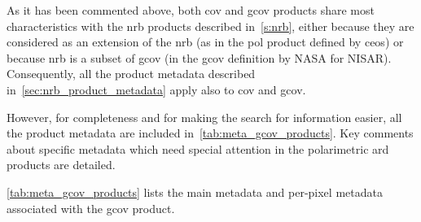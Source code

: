 As it has been commented above, both \acs{cov} and \acs{gcov} products share most characteristics with the \acs{nrb} products described in~\autoref{s:nrb}, either because they are considered as an extension of the \acs{nrb} (as in the \acs{pol} product defined by \acs{ceos}) or because \acs{nrb} is a subset of \acs{gcov} (in the \acs{gcov} definition by NASA for NISAR). Consequently, all the product metadata described in~\autoref{sec:nrb_product_metadata} apply also to \acs{cov} and \acs{gcov}. 

However, for completeness and for making the search for information easier, all the product metadata are included in~\autoref{tab:meta_gcov_products}. Key comments about specific metadata which need special attention in the polarimetric \acs{ard} products are detailed. 

\autoref{tab:meta_gcov_products} lists the main metadata and per-pixel metadata associated with the \acs{gcov} product.


